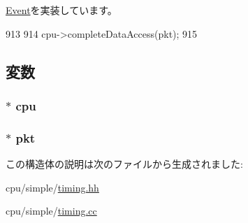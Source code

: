 \hyperlink{classEvent_a142b75b68a6291400e20fb0dd905b1c8}{Event}を実装しています。


\begin{DoxyCode}
913 {
914     cpu->completeDataAccess(pkt);
915 }
\end{DoxyCode}


\subsection{変数}
\hypertarget{structTimingSimpleCPU_1_1IprEvent_ace3e131319475077fac2fa861708b0c9}{
\subsubsection[{cpu}]{$\ast$ {\bf cpu}}}
\label{structTimingSimpleCPU_1_1IprEvent_ace3e131319475077fac2fa861708b0c9}
\hypertarget{structTimingSimpleCPU_1_1IprEvent_a267e60cd6919d05db58405ccc69bd7b0}{
\subsubsection[{pkt}]{$\ast$ {\bf pkt}}}
\label{structTimingSimpleCPU_1_1IprEvent_a267e60cd6919d05db58405ccc69bd7b0}


この構造体の説明は次のファイルから生成されました:\begin{DoxyCompactItemize}
\item 
cpu/simple/\hyperlink{timing_8hh}{timing.hh}\item 
cpu/simple/\hyperlink{timing_8cc}{timing.cc}\end{DoxyCompactItemize}
